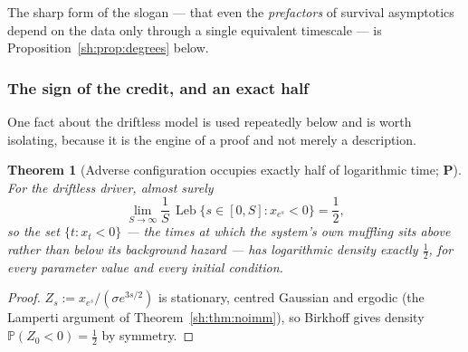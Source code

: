 \documentclass[11pt]{article}
\numberwithin{equation}{section}
\theoremstyle{plain}
\newtheorem{theorem}{Theorem}[section]
\theoremstyle{definition}
\theoremstyle{remark}
\newcommand{\PP}{\mathbb{P}}
\DeclareMathOperator{\Leb}{Leb}
\begin{document}
The sharp form of the slogan --- that even the \emph{prefactors} of survival
asymptotics depend on the data only through a single equivalent timescale ---
is Proposition~\ref{sh:prop:degrees} below.

\subsubsection{The sign of the credit, and an exact half}
\label{gr1:subsub:sign}

One fact about the driftless model is used repeatedly below and is worth
isolating, because it is the engine of a proof and not merely a
description.

\begin{theorem}[Adverse configuration occupies exactly half of
logarithmic time; \textbf{P}]\label{tc:thm:half}
For the driftless driver, almost surely
\begin{equation}\label{tc:eq:half}
\lim_{S\to\infty}\frac1S\,\Leb\bigl\{s\in[0,S]:x_{e^{s}}<0\bigr\}
=\frac12 ,
\end{equation}
so the set $\{t:x_t<0\}$ --- the times at which the system's own
muffling sits \emph{above} rather than below its background hazard ---
has logarithmic density exactly $\tfrac12$, for every parameter value
and every initial condition.
\end{theorem}

\begin{proof}
$Z_s:=x_{e^{s}}/(\sigma e^{3s/2})$ is stationary, centred Gaussian and
ergodic (the Lamperti argument of Theorem~\ref{sh:thm:noimm}), so
Birkhoff gives density $\PP(Z_0<0)=\tfrac12$ by symmetry.
\end{proof}
\end{document}
